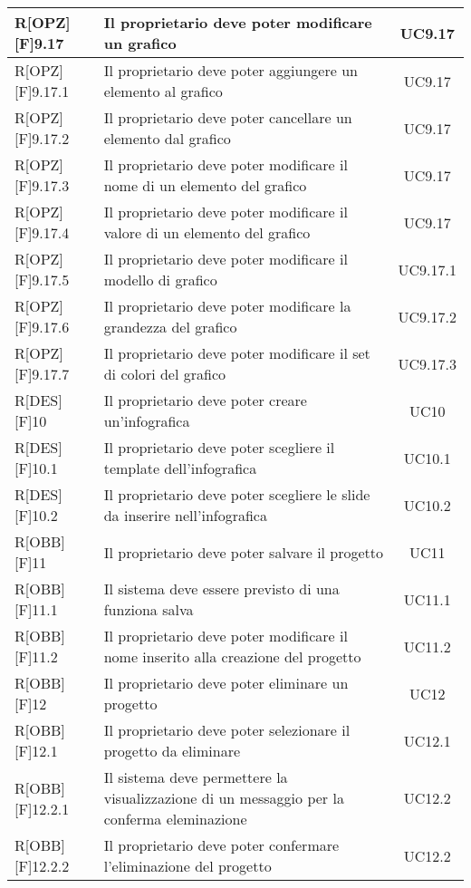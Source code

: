 \begin{longtable}{|l|p{}|c|}
		R[OPZ][F]9.17 & Il proprietario deve poter modificare un grafico & UC9.17 \\ \midrule
		R[OPZ][F]9.17.1 & Il proprietario deve poter aggiungere un elemento al grafico & UC9.17 \\ \midrule
		R[OPZ][F]9.17.2 & Il proprietario deve poter cancellare un elemento dal grafico & UC9.17 \\ \midrule
		R[OPZ][F]9.17.3 & Il proprietario deve poter modificare il nome di un elemento del grafico & UC9.17 \\ \midrule
		R[OPZ][F]9.17.4 & Il proprietario deve poter modificare il valore di un elemento del grafico & UC9.17 \\ \midrule
		R[OPZ][F]9.17.5 & Il proprietario deve poter modificare il modello di grafico & UC9.17.1 \\ \midrule
		R[OPZ][F]9.17.6 & Il proprietario deve poter modificare la grandezza del grafico & UC9.17.2 \\ \midrule
		R[OPZ][F]9.17.7 & Il proprietario deve poter modificare il set di colori del grafico & UC9.17.3 \\ \midrule
		
		R[DES][F]10 & Il proprietario deve poter creare un'infografica & UC10 \\ \midrule
		R[DES][F]10.1 & Il proprietario deve poter scegliere il template dell'infografica & UC10.1 \\ \midrule
		R[DES][F]10.2 & Il proprietario deve poter scegliere le slide da inserire nell'infografica & UC10.2 \\ \midrule
		
		R[OBB][F]11 & Il proprietario deve poter salvare il progetto & UC11 \\ \midrule
		R[OBB][F]11.1 & Il sistema deve essere previsto di una funziona salva & UC11.1 \\ \midrule
		R[OBB][F]11.2 & Il proprietario deve poter modificare il nome inserito alla creazione del progetto & UC11.2 \\ \midrule
		
		R[OBB][F]12 & Il proprietario deve poter eliminare un progetto & UC12 \\ \midrule
		R[OBB][F]12.1 & Il proprietario deve poter selezionare il progetto da eliminare & UC12.1 \\ \midrule
		R[OBB][F]12.2.1 & Il sistema deve permettere la visualizzazione di un messaggio per la conferma eleminazione & UC12.2 \\ \midrule
		R[OBB][F]12.2.2 & Il proprietario deve poter confermare l'eliminazione del progetto  & UC12.2 \\

		
	\end{longtable}	